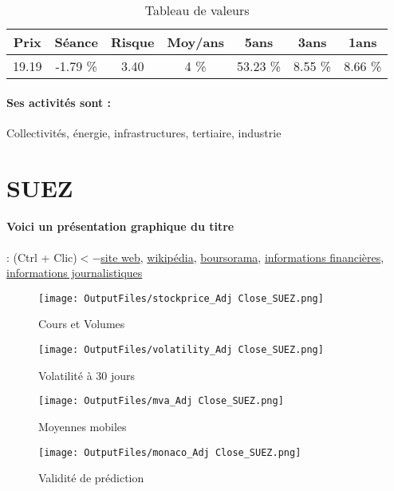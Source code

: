 \documentclass[11pt,a4paper]{report}%
\begin{document}
\begin{table}[H]
  \centering
    \begin{tabular}{|c|c|c|c|c|c|c|}
    \hline
    Prix & Séance & Risque  & Moy/ans & 5ans & 3ans & 1ans \\
    \hline
    19.19 &    -1.79 \%    & 3.40 & 4 \% & 53.23 \% & 8.55 \% & 8.66 \% \\
    \hline
    \end{tabular}%
        \label{tab:table_SPIE}%
      \caption{Tableau de valeurs}
\end{table}%

\paragraph{Ses activités sont : } Collectivités, énergie, infrastructures, tertiaire, industrie  
    
    \newpage

\section{SUEZ}

\paragraph{Voici un présentation graphique du titre} : (Ctrl + Clic)$<-$\href{https://www.suez.com/fr/finance/analystes-et-investisseurs}{site web}, \href{https://fr.wikipedia.org/wiki/Suez_(entreprise,_2015)}{wikipédia}, \href{https://www.boursorama.com/cours/1rPSEV}{boursorama}, \href{https://www.qwant.com/?q=site:https:%2f%2fwww.easybourse.com%2faction-societe%2fSUEZ&t=web&client=ext-firefox-hp}{informations financières}, \href{https://bourse.lerevenu.com/cours-de-bourse/fiche-valeur-synthese/SUEZ/SEV-FR}{informations journalistiques}
\begin{figure}[!htb]
   \begin{minipage}{0.5\textwidth}
     \centering
     \texttt{[image: OutputFiles/stockprice\_Adj Close\_SUEZ.png]}
     \caption{Cours et Volumes}\label{Fig:price_SUEZ}
   \end{minipage}\hfill
   \begin{minipage}{0.5\textwidth}
     \centering
     \texttt{[image: OutputFiles/volatility\_Adj Close\_SUEZ.png]}
     \caption{Volatilité à 30 jours}\label{Fig:volat_SUEZ}
   \end{minipage}
\end{figure}
\begin{figure}[!htb]
   \begin{minipage}{0.5\textwidth}
     \centering
     \texttt{[image: OutputFiles/mva\_Adj Close\_SUEZ.png]}
     \caption{Moyennes mobiles}\label{Fig:mva_SUEZ}
   \end{minipage}\hfill
   \begin{minipage}{0.5\textwidth}
     \centering
     \texttt{[image: OutputFiles/monaco\_Adj Close\_SUEZ.png]}
     \caption{Validité de prédiction}\label{Fig:prediction_SUEZ}
   \end{minipage}
\end{figure}
\end{document}
